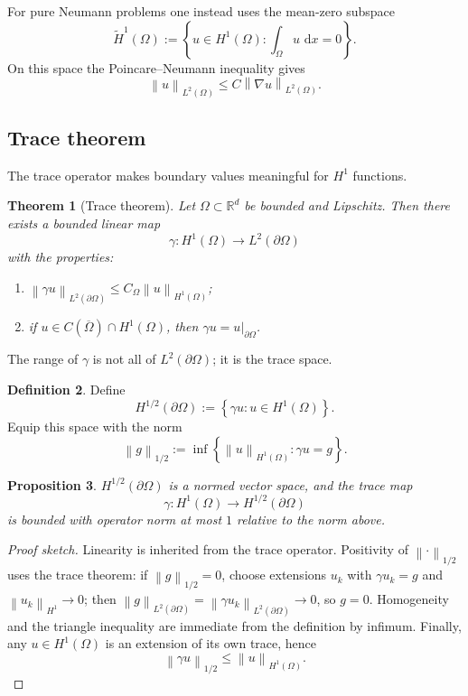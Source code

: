 \documentclass[11pt]{article}
\newtheorem{theorem}{Theorem}[section]
\newtheorem{proposition}[theorem]{Proposition}
\theoremstyle{definition}
\newtheorem{definition}[theorem]{Definition}
\newcommand{\R}{\mathbb{R}}
\newcommand{\grad}{\nabla}
\newcommand{\dd}{\,\mathrm{d}}
\newcommand{\norm}[1]{\left\lVert #1\right\rVert}
\newcommand{\set}[1]{\left\{ #1\right\}}
\newcommand{\eH}{\widetilde{H}}
\begin{document}
For pure Neumann problems one instead uses the mean-zero subspace
\[
\eH^1(\Omega):=\set{u\in H^1(\Omega): \int_\Omega u\,\dd x = 0}.
\]
On this space the Poincare--Neumann inequality gives
\[
\norm{u}_{L^2(\Omega)} \le C \norm{\grad u}_{L^2(\Omega)}.
\]

\subsection{Trace theorem}

The trace operator makes boundary values meaningful for $H^1$ functions.

\begin{theorem}[Trace theorem]
Let $\Omega\subset\R^d$ be bounded and Lipschitz. Then there exists a bounded linear map
\[
\gamma:H^1(\Omega)\to L^2(\partial\Omega)
\]
with the properties:
\begin{enumerate}
    \item $\norm{\gamma u}_{L^2(\partial\Omega)} \le C_\Omega \norm{u}_{H^1(\Omega)}$;
    \item if $u\in C(\overline\Omega)\cap H^1(\Omega)$, then $\gamma u = u|_{\partial\Omega}$.
\end{enumerate}
\end{theorem}

The range of $\gamma$ is not all of $L^2(\partial\Omega)$; it is the trace space.

\begin{definition}
Define
\[
H^{1/2}(\partial\Omega) := \set{\gamma u : u\in H^1(\Omega)}.
\]
Equip this space with the norm
\[
\norm{g}_{1/2} := \inf\set{\norm{u}_{H^1(\Omega)} : \gamma u = g}.
\]
\end{definition}

\begin{proposition}
$H^{1/2}(\partial\Omega)$ is a normed vector space, and the trace map
\[
\gamma:H^1(\Omega)\to H^{1/2}(\partial\Omega)
\]
is bounded with operator norm at most $1$ relative to the norm above.
\end{proposition}

\begin{proof}[Proof sketch]
Linearity is inherited from the trace operator. Positivity of $\norm{\cdot}_{1/2}$ uses the trace theorem: if $\norm{g}_{1/2}=0$, choose extensions $u_k$ with $\gamma u_k=g$ and $\norm{u_k}_{H^1}\to 0$; then $\norm{g}_{L^2(\partial\Omega)}=\norm{\gamma u_k}_{L^2(\partial\Omega)}\to 0$, so $g=0$. Homogeneity and the triangle inequality are immediate from the definition by infimum. Finally, any $u\in H^1(\Omega)$ is an extension of its own trace, hence
\[
\norm{\gamma u}_{1/2}\le \norm{u}_{H^1(\Omega)}.
\]
\end{proof}
\end{document}
